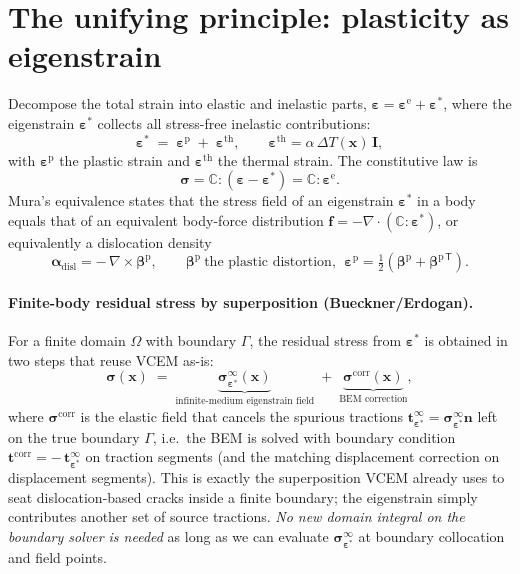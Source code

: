 \documentclass[11pt]{article}
\newcommand{\nvec}{\mathbf{n}}
\newcommand{\xvec}{\mathbf{x}}
\newcommand{\tvec}{\mathbf{t}}
\newcommand{\bdry}{\Gamma}
\newcommand{\dom}{\Omega}
\newcommand{\epspl}{\bm{\varepsilon}^{\mathrm{p}}}
\newcommand{\epsstar}{\bm{\varepsilon}^{*}}
\newcommand{\sig}{\bm{\sigma}}
\newcommand{\eps}{\bm{\varepsilon}}
\newcommand{\Cstiff}{\mathbb{C}}
\newcommand{\half}{\tfrac{1}{2}}
\begin{document}
\section{The unifying principle: plasticity as eigenstrain}
\label{sec:eigenstrain}

Decompose the total strain into elastic and inelastic parts,
$\eps = \eps^{\mathrm e} + \epsstar$, where the eigenstrain $\epsstar$ collects
all stress-free inelastic contributions:
\begin{equation}
\epsstar \;=\; \epspl \;+\; \eps^{\mathrm{th}},
\qquad
\eps^{\mathrm{th}} = \alpha\,\Delta T(\xvec)\,\mathbf{I},
\label{eq:eigen-decomp}
\end{equation}
with $\epspl$ the plastic strain and $\eps^{\mathrm{th}}$ the thermal strain.
The constitutive law is
\begin{equation}
\sig = \Cstiff : (\eps - \epsstar) = \Cstiff : \eps^{\mathrm e}.
\label{eq:hooke-eigen}
\end{equation}
Mura's equivalence \citep{mura1987} states that the stress field of an
eigenstrain $\epsstar$ in a body equals that of an equivalent body-force
distribution $\mathbf f = -\nabla\!\cdot(\Cstiff:\epsstar)$, or equivalently a
dislocation density
\begin{equation}
\bm{\alpha}_{\mathrm{disl}} = -\,\nabla\times\bm{\beta}^{\mathrm p},
\qquad \bm{\beta}^{\mathrm p}\ \text{the plastic distortion},\ \
\epspl=\half(\bm{\beta}^{\mathrm p}+\bm{\beta}^{\mathrm p\,\mathsf T}).
\label{eq:disl-density}
\end{equation}

\paragraph{Finite-body residual stress by superposition (Bueckner/Erdogan).}
For a finite domain $\dom$ with boundary $\bdry$, the residual stress from
$\epsstar$ is obtained in two steps that reuse VCEM as-is:
\begin{equation}
\sig(\xvec) \;=\; \underbrace{\sig^{\infty}_{\epsstar}(\xvec)}_{\text{infinite-medium eigenstrain field}}
\;+\;
\underbrace{\sig^{\mathrm{corr}}(\xvec)}_{\text{BEM correction}} ,
\label{eq:superpose}
\end{equation}
where $\sig^{\mathrm{corr}}$ is the elastic field that cancels the spurious
tractions $\tvec^{\infty}_{\epsstar}=\sig^{\infty}_{\epsstar}\nvec$ left on the
true boundary $\bdry$, i.e.\ the BEM is solved with boundary condition
$\tvec^{\mathrm{corr}} = -\,\tvec^{\infty}_{\epsstar}$ on traction segments (and
the matching displacement correction on displacement segments). This is exactly
the superposition VCEM already uses to seat dislocation-based cracks inside a
finite boundary; the eigenstrain simply contributes another set of source
tractions. \emph{No new domain integral on the boundary solver is needed} as
long as we can evaluate $\sig^{\infty}_{\epsstar}$ at boundary collocation and
field points.
\end{document}
